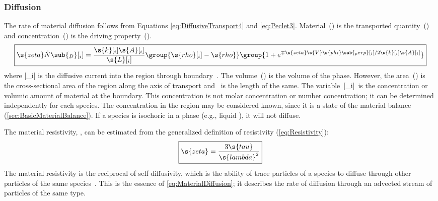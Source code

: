 \subsubsection{Diffusion}
\label{sec:MaterialDiffusion}

The rate of material diffusion follows from Equations \ref{eq:DiffusiveTransport4} and \ref{eq:Peclet3}.  Material~() is the transported quantity~() and concentration~() is the driving property~().
\begin{equation}
  \label{eq:MaterialDiffusion}
  \boxed{\s{zeta}\dot{N}\sub{_D}[_i] = \frac{\s{k}[_i]\s{A}[_i]}{\s{L}[_i]}\group{\s{rho}[_i] - \s{rho}}\group{1 + e^{\mp\s{zeta}\s{V}\s{phi}\sub{_perp}[_i]/2\s{k}[_i]\s{A}[_i]}}}
\end{equation}
where [_i] is the diffusive current into the region through boundary~.  The volume~() is the volume of the phase.  However, the area~() is the cross-sectional area of the region along the axis of transport and ~is the length of the same.  The variable~[_i]~is the concentration or volumic amount of material at the boundary.   This concentration is not molar concentration or number concentration; it can be determined independently for each species.   The concentration in the region may be considered known, since it is a state of the material balance (\autoref{sec:BasicMaterialBalance}).  If a species is isochoric in a phase (e.g., liquid ), it will not diffuse.

The material resistivity, , can be estimated from the generalized definition of resistivity (\autoref{eq:Resistivity}):
\begin{equation}
  \label{eq:MaterialResistivity}
  \boxed{\s{zeta} = \frac{3\s{tau}}{\s{lambda}^2}}
\end{equation}
The material resistivity is the reciprocal of self diffusivity, which is the ability of trace particles of a species to diffuse through other particles of the same species~\cite{Present1958}.  This is the essence of \autoref{eq:MaterialDiffusion}; it describes the rate of diffusion through an advected stream of particles of the same type.

